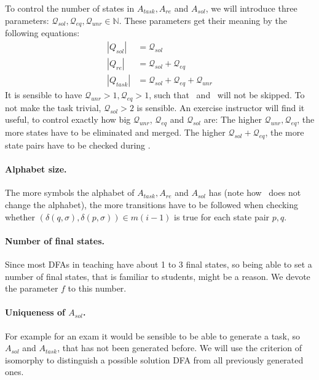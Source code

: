 To control the number of states in $A_{task}, A_{re}$ and $A_{sol}$, we will introduce three parameters: $\mathcal{Q}_{sol}, \mathcal{Q}_{eq}, \mathcal{Q}_{unr} \in \mathbb{N}$. These parameters get their meaning by the following equations:
\begin{align*}
    |Q_{sol}| &= \mathcal{Q}_{sol} \\
    |Q_{re}| &= \mathcal{Q}_{sol} + \mathcal{Q}_{eq} \\
    |Q_{task}| &= \mathcal{Q}_{sol} + \mathcal{Q}_{eq} + \mathcal{Q}_{unr}
\end{align*}
It is sensible to have $\mathcal{Q}_{unr} > 1, \mathcal{Q}_{eq} > 1$, such that \RemUnr\ and \RemEq\ will not be skipped. To not make the task trivial, $\mathcal{Q}_{sol} > 2$ is sensible. An exercise instructor will find it useful, to control exactly how big $\mathcal{Q}_{unr}$, $\mathcal{Q}_{eq}$ and $\mathcal{Q}_{sol}$ are: The higher $\mathcal{Q}_{unr}, \mathcal{Q}_{eq}$, the more states have to be eliminated and merged. The higher $\mathcal{Q}_{sol} + \mathcal{Q}_{eq}$, the more state pairs have to be checked during \CompDist.

\paragraph*{Alphabet size.}

The more symbols the alphabet of $A_{task}, A_{re}$ and $A_{sol}$ has (note how \MinAlg\ does not change the alphabet), the more transitions have to be followed when checking whether $(\delta(q,\sigma),\delta(p,\sigma))\in m(i-1)$ is true for each state pair $p,q$.

\paragraph*{Number of final states.}

Since most DFAs in teaching have about 1 to 3 final states, so being able to set a number of final states, that is familiar to students, might be a reason. We devote the parameter $f$ to this number.

\paragraph*{Uniqueness of $A_{sol}$.}

For example for an exam it would be sensible to be able to generate a task, so $A_{sol}$ and $A_{task}$, that has not been generated before. We will use the criterion of isomorphy to distinguish a possible solution DFA from all previously generated ones.

